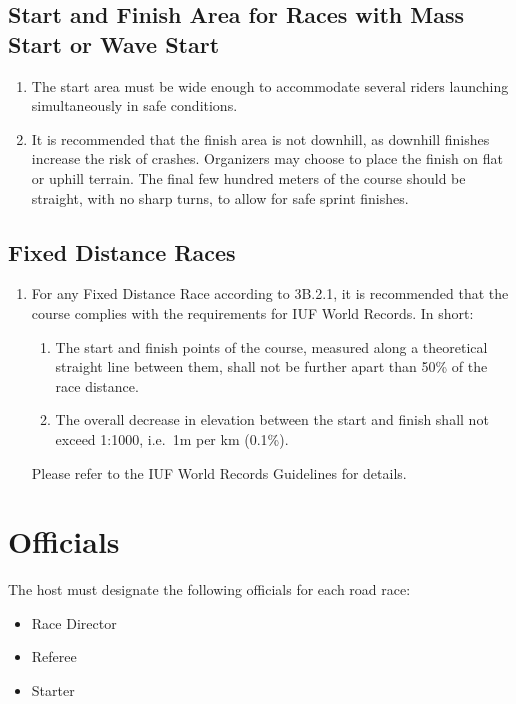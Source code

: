\subsection{Start and Finish Area for Races with Mass Start or Wave Start}
	\begin{enumerate}[leftmargin=1.5em,labelsep=*]
		\item The start area must be wide enough to accommodate several riders launching simultaneously in safe conditions.
		\item It is recommended that the finish area is not downhill, as downhill finishes increase the risk of crashes.
		Organizers may choose to place the finish on flat or uphill terrain.
		The final few hundred meters of the course should be straight, with no sharp turns, to allow for safe sprint finishes.
	\end{enumerate}

\subsection{Fixed Distance Races \label{sec_venue_fixed_distance}}
	\begin{enumerate}[leftmargin=1.5em,labelsep=*]
		\item For any Fixed Distance Race according to 3B.2.1, it is recommended that the course complies with the requirements for IUF World Records.
		In short:
		\begin{enumerate}[label=\roman*,leftmargin=1.75em,labelsep=*]
			\item The start and finish points of the course, measured along a theoretical straight line between them, shall not be further apart than 50\% of the race distance.
			\item The overall decrease in elevation between the start and finish shall not exceed 1:1000, i.e.\ 1m per km (0.1\%).
		\end{enumerate}
		Please refer to the IUF World Records Guidelines for details.
	\end{enumerate}

\section{Officials}

The host must designate the following officials for each road race:
\begin{itemize}
\item Race Director
\item Referee
\item Starter
\end{itemize}

